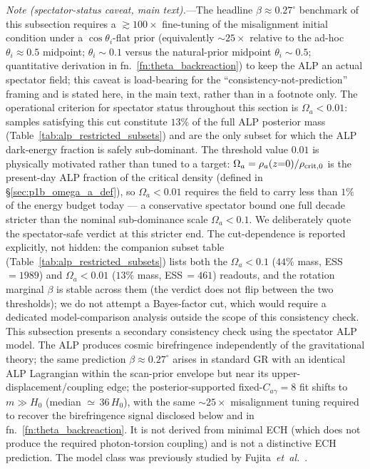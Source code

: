 \documentclass[aps,prd,twocolumn,superscriptaddress,showpacs,preprintnumbers,nofootinbib,longbibliography,floatfix]{revtex4-2}
\newcommand{\etal}{\textit{et~al.}}
\begin{document}
\textit{Note (spectator-status caveat, main text).}---The headline
$\beta\approx 0.27^\circ$ benchmark of this subsection requires a
${\gtrsim}100\times$ fine-tuning of the misalignment initial condition
under a $\cos\theta_i$-flat prior (equivalently ${\sim}25\times$ relative
to the ad-hoc $\theta_i\!\approx\!0.5$ midpoint;
$\theta_i\sim 0.1$ versus the natural-prior midpoint $\theta_i\sim 0.5$;
quantitative derivation in fn.~\ref{fn:theta_backreaction}) to keep the
ALP an actual spectator field; this caveat is load-bearing for the
``consistency-not-prediction'' framing and is stated here, in the main
text, rather than in a footnote only.
The operational criterion for spectator status throughout this section is
$\Omega_a < 0.01$: samples satisfying this cut constitute $13\%$ of the full
ALP posterior mass (Table~\ref{tab:alp_restricted_subsets}) and are the only
subset for which the ALP dark-energy fraction is safely sub-dominant.
The threshold value $0.01$ is physically motivated rather than tuned to a
target: $\Omega_a = \rho_a(z{=}0)/\rho_{\rm crit,0}$ is the present-day ALP
fraction of the critical density (defined in
\S\ref{sec:p1b_omega_a_def}), so $\Omega_a < 0.01$ requires the field to carry
less than $1\%$ of the energy budget today --- a conservative spectator bound
one full decade stricter than the nominal sub-dominance scale
$\Omega_a < 0.1$. We deliberately quote the spectator-safe verdict at this
stricter end. The cut-dependence is reported explicitly, not hidden: the
companion subset table (Table~\ref{tab:alp_restricted_subsets}) lists both the
$\Omega_a < 0.1$ ($44\%$ mass, ESS\,$=1989$) and $\Omega_a < 0.01$ ($13\%$
mass, ESS\,$=461$) readouts, and the rotation marginal $\beta$ is stable
across them (the verdict does not flip between the two thresholds); we do not
attempt a Bayes-factor cut, which would require a dedicated model-comparison
analysis outside the scope of this consistency check.
This subsection presents a secondary consistency check using the
spectator ALP model. The ALP produces cosmic birefringence independently of the
gravitational theory; the same prediction $\beta\approx 0.27^\circ$ arises in
standard GR with an identical ALP Lagrangian within the scan-prior envelope
but near its upper-displacement/coupling edge; the posterior-supported
fixed-$C_{a\gamma}\!=\!8$ fit shifts to $m\!\gg\!H_0$ (median ${\simeq}\,36\,H_0$),
with the same $\sim 25\times$ misalignment tuning required to recover
the birefringence signal disclosed below and in fn.~\ref{fn:theta_backreaction}.
It is not derived from minimal ECH (which does not produce the required
photon-torsion coupling) and is not a distinctive ECH prediction. The model class was previously
studied by Fujita~\etal~\cite{Fujita2021}.
\end{document}

